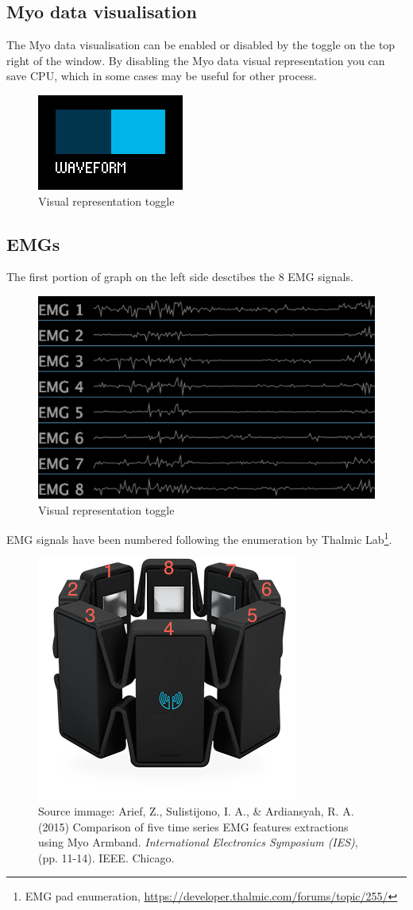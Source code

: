 \documentclass[12pt,a4paper]{article}
\begin{document}
		\subsection{Myo data visualisation}
		The Myo data visualisation can be enabled or disabled by the toggle on the top right of the window. By disabling the Myo data visual representation you can save CPU, which in some cases may be useful for other process.
		
			\begin{figure}[h]
				\centering
				\includegraphics[width=0.1\linewidth]{../images/MyoMapper-Waveform}
				\caption{Visual representation toggle}
				\label{fig:MyoMapper-Waveform}
			\end{figure}

		\subsection{EMGs}
		The first portion of graph on the left side desctibes the 8 EMG signals.
		
			\begin{figure}[h]
				\centering
				\includegraphics[width=0.6\linewidth]{../images/MyoMapper-EMG}
				\caption{Visual representation toggle}
				\label{fig:MyoMapper-EMG}
			\end{figure}
		
		EMG signals have been numbered following the enumeration by Thalmic Lab\footnote{EMG pad enumeration, \url{https://developer.thalmic.com/forums/topic/255/}}.
		
		\begin{figure}[h]
			\centering
			\includegraphics[width=0.4\linewidth]{../images/EMG-myo-pad-enumeration}
		    \caption{Source immage: Arief, Z., Sulistijono, I. A., \& Ardiansyah, R. A. (2015) Comparison of five time series EMG features extractions using Myo Armband. \textit{International Electronics Symposium (IES)},  (pp. 11-14). IEEE. Chicago.}
			\label{fig:EMG-myo-pad-enumeration}
		\end{figure}
		
\end{document}
